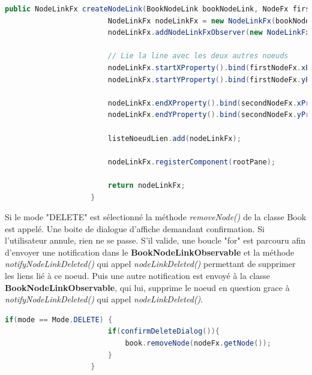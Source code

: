 				\begin{lstlisting}[gobble=20, language=java, caption=nodeLinkAdded()]
					public NodeLinkFx createNodeLink(BookNodeLink bookNodeLink, NodeFx firstNodeFx, NodeFx secondNodeFx) {
						NodeLinkFx nodeLinkFx = new NodeLinkFx(bookNodeLink, firstNodeFx, secondNodeFx, zoom);
						nodeLinkFx.addNodeLinkFxObserver(new NodeLinkFxListener());

						// Lie la line avec les deux autres noeuds
						nodeLinkFx.startXProperty().bind(firstNodeFx.xProperty().add(firstNodeFx.widthProperty().divide(2)));
						nodeLinkFx.startYProperty().bind(firstNodeFx.yProperty().add(firstNodeFx.heightProperty().divide(2)));

						nodeLinkFx.endXProperty().bind(secondNodeFx.xProperty().add(secondNodeFx.widthProperty().divide(2)));
						nodeLinkFx.endYProperty().bind(secondNodeFx.yProperty().add(secondNodeFx.heightProperty().divide(2)));

						listeNoeudLien.add(nodeLinkFx);

						nodeLinkFx.registerComponent(rootPane);

						return nodeLinkFx;
					}
				\end{lstlisting}


				Si le mode "DELETE" est sélectionné la méthode \textit{removeNode()} de la classe Book est appelé. Une boite de dialogue d'affiche demandant confirmation. Si l'utilisateur annule, rien ne se passe. S'il valide, une boucle "for" est parcouru afin d'envoyer une notification dans le \textbf{BookNodeLinkObservable} et la méthode \textit{notifyNodeLinkDeleted()} qui appel \textit{nodeLinkDeleted()} permettant de supprimer les liens lié à ce noeud. Puis une autre notification est envoyé à la classe \textbf{BookNodeLinkObservable}, qui lui, supprime le noeud en question grace à \textit{notifyNodeLinkDeleted()} qui appel \textit{nodeLinkDeleted()}.

				\begin{lstlisting}[gobble=20, language=java, caption=Classe NodeFxListener avec le mode DELETE]
					if(mode == Mode.DELETE) {
						if(confirmDeleteDialog()){
							book.removeNode(nodeFx.getNode());
						}
					}
				\end{lstlisting}

